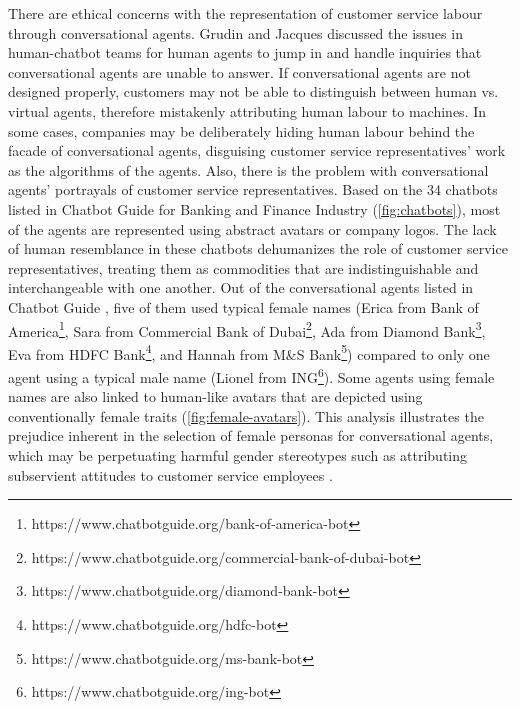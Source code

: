 \documentclass{sigchi-ext}
\begin{document}
There are ethical concerns with the representation of customer service labour through conversational agents. Grudin and Jacques \cite{grudin2019chatbots} discussed the issues in human-chatbot teams for human agents to jump in and handle inquiries that conversational agents are unable to answer. If conversational agents are not designed properly, customers may not be able to distinguish between human vs. virtual agents, therefore mistakenly attributing human labour to machines. In some cases, companies may be deliberately hiding human labour behind the facade of conversational agents, disguising customer service representatives' work as the algorithms of the agents. Also, there is the problem with conversational agents' portrayals of customer service representatives. Based on the 34 chatbots listed in Chatbot Guide for Banking and Finance Industry \cite{chatbotguide} (\autoref{fig:chatbots}), most of the agents are represented using abstract avatars or company logos. The lack of human resemblance in these chatbots dehumanizes the role of customer service representatives, treating them as commodities that are indistinguishable and interchangeable with one another. Out of the conversational agents listed in Chatbot Guide \cite{chatbotguide}, five of them used typical female names (Erica from Bank of America\footnote{https://www.chatbotguide.org/bank-of-america-bot}, Sara from Commercial Bank of Dubai\footnote{https://www.chatbotguide.org/commercial-bank-of-dubai-bot}, Ada from Diamond Bank\footnote{https://www.chatbotguide.org/diamond-bank-bot}, Eva from HDFC Bank\footnote{https://www.chatbotguide.org/hdfc-bot}, and Hannah from M\&S Bank\footnote{https://www.chatbotguide.org/ms-bank-bot}) compared to only one agent using a typical male name (Lionel from ING\footnote{https://www.chatbotguide.org/ing-bot}). Some agents using female names are also linked to human-like avatars that are depicted using conventionally female traits (\autoref{fig:female-avatars}). This analysis illustrates the prejudice inherent in the selection of female personas for conversational agents, which may be perpetuating harmful gender stereotypes such as attributing subservient attitudes to customer service employees \cite{ruane2019conversational}.
\end{document}
